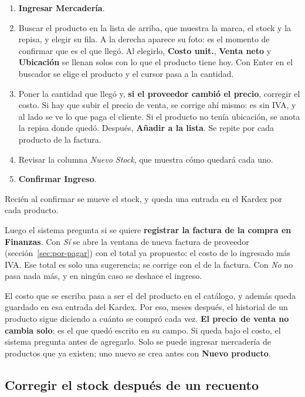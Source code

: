 \documentclass[11pt,a4paper]{article}
\begin{document}

\begin{enumerate}
  \item \textbf{Ingresar Mercadería}.
  \item Buscar el producto en la lista de arriba, que muestra la marca, el
        stock y la repisa, y elegir su fila. A la derecha aparece su foto:
        es el momento de confirmar que es el que llegó. Al elegirlo,
        \textbf{Costo unit.}, \textbf{Venta neto} y \textbf{Ubicación} se
        llenan solos con lo que el producto tiene hoy. Con Enter en el buscador
        se elige el producto y el cursor pasa a la cantidad.
  \item Poner la cantidad que llegó y, \textbf{si el proveedor cambió el
        precio}, corregir el costo. Si hay que subir el precio de venta, se
        corrige ahí mismo: es sin IVA, y al lado se ve lo que paga el cliente.
        Si el producto no tenía ubicación, se anota la repisa donde quedó.
        Después, \textbf{Añadir a la lista}. Se repite por cada producto de la
        factura.
  \item Revisar la columna \emph{Nuevo Stock}, que muestra cómo quedará cada uno.
  \item \textbf{Confirmar Ingreso}.
\end{enumerate}

Recién al confirmar se mueve el stock, y queda una entrada en el Kardex por cada
producto.

Luego el sistema pregunta si se quiere \textbf{registrar la factura de la
compra en Finanzas}. Con \emph{Sí} se abre la ventana de nueva factura de
proveedor (sección~\ref{sec:por-pagar}) con el total ya propuesto: el costo de
lo ingresado más IVA. Ese total es solo una sugerencia; se corrige con el de la
factura. Con \emph{No} no pasa nada más, y en ningún caso se deshace el
ingreso.

El costo que se escriba pasa a ser el del producto en el catálogo, y además
queda guardado en esa entrada del Kardex. Por eso, meses después, el historial
de un producto sigue diciendo a cuánto se compró cada vez. \textbf{El precio de
venta no cambia solo}: es el que quedó escrito en su campo. Si queda bajo el
costo, el sistema pregunta antes de agregarlo. Solo se puede ingresar
mercadería de productos que ya existen; uno nuevo se crea antes con
\textbf{Nuevo producto}.

\subsection{Corregir el stock después de un recuento}
\end{document}
